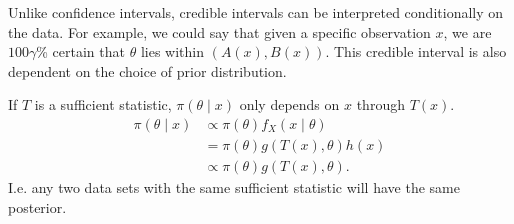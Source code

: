 \begin{remark}
	Unlike confidence intervals, credible intervals can be interpreted conditionally on the data.
	For example, we could say that given a specific observation $x$, we are $100 \gamma$\% certain that $\theta$ lies within $(A(x), B(x))$.
	This credible interval is also dependent on the choice of prior distribution.
\end{remark}

\begin{note}
	If $T$ is a sufficient statistic, $\pi(\theta \mid x)$ only depends on $x$ through $T(x)$.
	\begin{align*}
		\pi(\theta \mid x) &\propto \pi(\theta) f_X(x \mid \theta) \\
		&= \pi(\theta) g(T(x), \theta) h(x) \\
		&\propto \pi(\theta) g(T(x), \theta).
	\end{align*} 
	I.e. any two data sets with the same sufficient statistic will have the same posterior.
\end{note} 